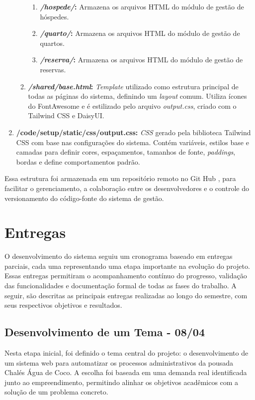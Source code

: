\documentclass[
	12pt,				%
	openany,			%
	oneside,			%
	a4paper,			%
	english,			%
	french,				%
	spanish,			%
	brazil				%
	]{abntex2}
\begin{document}
\begin{enumerate}
\begin{enumerate}
		\begin{enumerate}
			\item \textbf{\textit{/hospede/}:} Armazena os arquivos HTML do módulo de gestão de hóspedes.
			\item \textbf{\textit{/quarto/}:} Armazena os arquivos HTML do módulo de gestão de quartos.
			\item \textbf{\textit{/reserva/}:}  Armazena os arquivos HTML do módulo de gestão de reservas.
		\end{enumerate}
		\item \textbf{\textit{/shared/base.html}:} \textit{Template} utilizado como estrutura principal de todas as páginas do sistema, definindo um \textit{layout} comum. Utiliza ícones do FontAwesome e é estilizado pelo arquivo \textit{output.css}, criado com o Tailwind CSS e DaisyUI.
	\end{enumerate}
	\item \textbf{/code/setup/static/css/output.css:} \textit{CSS} gerado pela biblioteca Tailwind CSS com base nas configurações do sistema. Contém variáveis, estilos base e camadas para definir cores, espaçamentos, tamanhos de fonte, \textit{paddings}, bordas e define comportamentos padrão.
\end{enumerate}

Essa estrutura foi armazenada em um repositório remoto no Git Hub \cite{repositorio}, para facilitar o gerenciamento, a colaboração entre os desenvolvedores e o controle do versionamento do código-fonte do sistema de gestão. 

\section{Entregas}
O desenvolvimento do sistema seguiu um cronograma baseado em entregas parciais, cada uma representando uma etapa importante na evolução do projeto. Essas entregas permitiram o acompanhamento contínuo do progresso, validação das funcionalidades e documentação formal de todas as fases do trabalho. A seguir, são descritas as principais entregas realizadas ao longo do semestre, com seus respectivos objetivos e resultados.
\subsection{Desenvolvimento de um Tema - 08/04}

Nesta etapa inicial, foi definido o tema central do projeto: o desenvolvimento de um sistema web para automatizar os processos administrativos da pousada Chalés Água de Coco. A escolha foi baseada em uma demanda real identificada junto ao empreendimento, permitindo alinhar os objetivos acadêmicos com a solução de um problema concreto.
\end{document}

